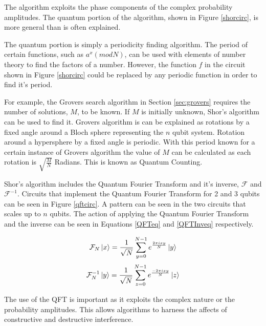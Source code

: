 The algorithm exploits the phase components of the complex probability amplitudes.
The quantum portion of the algorithm, shown in Figure \ref{shorcirc}, is more general than is often explained.

The quantum portion is simply a periodicity finding algorithm.
The period of certain functions, such as $a^x(mod N)$, can be used with elements of number theory to find the factors of a number.
However, the function $f$ in the circuit shown in Figure \ref{shorcirc} could be replaced by any periodic function in order to find it's period.

For example, the Grovers search algorithm in Section \ref{sec:grovers} requires the number of solutions, $M$, to be known.
If $M$ is initially unknown, Shor's algorithm can be used to find it.
Grovers algorithm is can be explained as rotations by a fixed angle around a Bloch sphere representing the $n$ qubit system.
Rotation around a hypersphere by a fixed angle is periodic. 
With this period known for a certain instance of Grovers algorithm the value of $M$ can be calculated as each rotation is $\sqrt{\frac{M}{N}}$ Radians.
This is known as Quantum Counting\cite{Brassard:1998vj}.

Shor's algorithm includes the Quantum Fourier Transform and it's inverse, $\mathcal{F}$ and $\mathcal{F}^{-1}$.
Circuits that implement the Quantum Fourier Transform for 2 and 3 qubits can be seen in Figure \ref{qftcirc}.
A pattern can be seen in the two circuits that scales up to $n$ qubits.
The action of applying the Quantum Fourier Transform and the inverse can be seen in Equations \ref{QFTeq} and \ref{QFTInveq} respectively.

\begin{equation}
 \mathcal{F}_N\left\vert{x}\right\rangle=\frac{1}{\sqrt{N}}\sum_{y=0}^{N-1}e^{\frac{2\pi{i}xy}{N}}\left\vert{y}\right\rangle
\label{QFTeq}
\end{equation}
\begin{equation}
 \mathcal{F}^{-1}_N\left\vert{y}\right\rangle=\frac{1}{\sqrt{N}}\sum_{z=0}^{N-1}e^{\frac{-2\pi{i}xy}{N}}\left\vert{z}\right\rangle
\label{QFTInveq}
\end{equation}

The use of the QFT is important as it exploits the complex nature or the probability amplitudes.
This allows algorithms to harness the affects of constructive and destructive interference.


